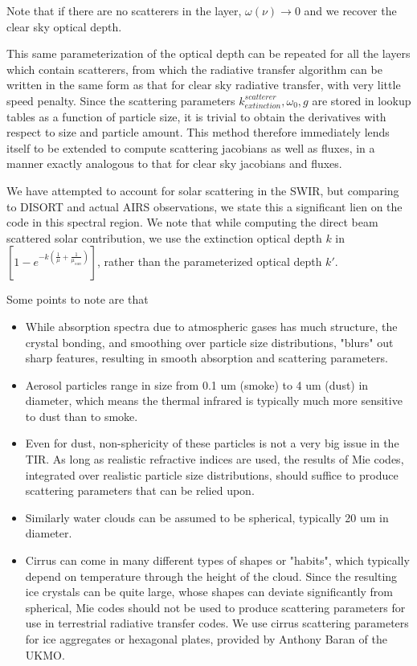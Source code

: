 \documentclass[11pt]{article}
\begin{document}
Note that if there are no scatterers in the layer, $\omega(\nu) \rightarrow 0$ and
we recover the clear sky optical depth. 

This same parameterization of the optical depth can be repeated for all the
layers which contain scatterers, from which the radiative transfer algorithm
can be written in the same form as that for clear sky radiative transfer, with
very little speed penalty. Since
the scattering parameters $k^{scatterer}_{extinction},\omega_{0},g$ are stored
in lookup
tables as a function of particle size, it is trivial to obtain the derivatives
with respect to size and particle amount. This method therefore immediately
lends itself to be extended to compute scattering jacobians as well as fluxes,
in a manner exactly analogous to that for clear sky jacobians and fluxes.

We have attempted to account for solar scattering in the SWIR, but comparing to 
DISORT and actual AIRS observations, we state this a significant lien on the code
in this spectral region.
We note that while computing the direct beam scattered solar contribution, we
use the extinction optical depth $k$ in
  $ \left[ 1 - e^{-k (\frac{1}{\mu} + \frac{1}{\mu_{sun}})} \right]$, rather
than the parameterized optical depth $k \prime$.

Some points to note are that
\begin{itemize}
  \item While absorption spectra due to atmospheric gases has much structure, the crystal
        bonding, and smoothing over particle size distributions, "blurs" out sharp features, resulting 
        in smooth absorption and scattering parameters.
  \item Aerosol particles range in size from 0.1 um (smoke) to 4 um (dust) in diameter, which means 
        the thermal infrared is typically much more sensitive to dust than to smoke.
  \item Even for dust, non-sphericity of these particles is not a very big issue in the TIR.
        As long as realistic refractive indices are used, the results of Mie codes, integrated over 
        realistic particle size distributions, should suffice to produce scattering parameters that can be
        relied upon.
  \item Similarly water clouds can be assumed to be spherical, typically 20 um in diameter.
  \item Cirrus can come in many different types of shapes or "habits", which typically
        depend on temperature through the height of the cloud. Since the resulting ice 
        crystals can be quite large, whose shapes can deviate significantly from spherical, Mie codes should
        not be used to produce scattering parameters for use in terrestrial radiative transfer codes. 
        We use cirrus scattering parameters for ice aggregates or hexagonal plates, provided by
        Anthony Baran of the UKMO.
\end{itemize}
\end{document}
